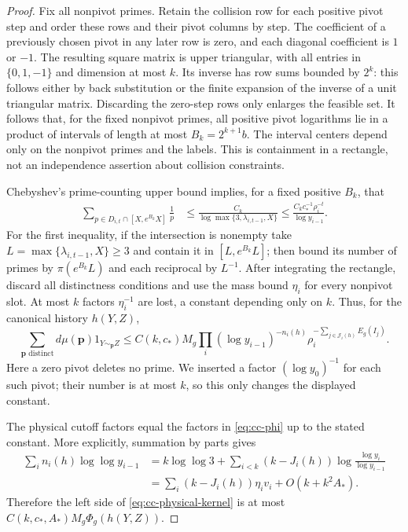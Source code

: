\begin{proof}
Fix all nonpivot primes. Retain the collision row for each positive
pivot step and order these rows and their pivot columns by step.
The coefficient of a previously chosen pivot in any later row is
zero, and each diagonal coefficient is $1$ or $-1$. The resulting
square matrix is upper triangular, with all entries in
$\{0,1,-1\}$ and dimension at most $k$. Its inverse has row sums
bounded by $2^k$: this follows either by back substitution or the
finite expansion of the inverse of a unit triangular matrix.
Discarding the zero-step rows only enlarges the feasible set.
It follows that, for the fixed nonpivot primes, all positive pivot
logarithms lie in a product of intervals of length at most
$B_k=2^{k+1}b$. The interval centers depend only on the nonpivot
primes and the labels. This is containment in a rectangle, not an
independence assertion about collision constraints.

Chebyshev's prime-counting upper bound implies, for a fixed positive
$B_k$, that
\begin{align}
 \sum_{p\in D_{i,t}\cap[X,e^{B_k}X]}\frac1p
 &\le\frac{C_k}{\log\max\{3,\lambda_{i,t-1},X\}}
 \le\frac{C_kc_*^{-1}\rho_i^{-t}}{\log y_{i-1}}.
                                                     \label{eq:cc-pivot-mass}
\end{align}
For the first inequality, if the intersection is nonempty take
$L=\max\{\lambda_{i,t-1},X\}\ge3$ and contain it in
$[L,e^{B_k}L]$; then bound its number of primes by
$\pi(e^{B_k}L)$ and each reciprocal by $L^{-1}$.
After integrating the rectangle, discard all distinctness conditions
and use the mass bound $\eta_i$ for every nonpivot slot. At most
$k$ factors $\eta_i^{-1}$ are lost, a constant depending only on
$k$. Thus, for the canonical history $h(Y,Z)$,
\begin{equation}\label{eq:cc-physical-kernel}
 \sum_{\mathbf p\text{ distinct}}d\mu(\mathbf p)
               1_{Y\sim_{\mathbf p}Z}
 \le C(k,c_*)M_g
     \prod_i(\log y_{i-1})^{-n_i(h)}
     \rho_i^{-\sum_{j\in\mathcal J_i(h)}E_g(I_j)}.
\end{equation}
Here a zero pivot deletes no prime. We inserted a factor
$(\log y_0)^{-1}$ for each such pivot; their number is at most
$k$, so this only changes the displayed constant.

The physical cutoff factors equal the factors in
\eqref{eq:cc-phi} up to the stated constant. More explicitly,
summation by parts gives
\begin{align*}
 \sum_i n_i(h)\log\log y_{i-1}
 &=k\log\log3+
   \sum_{i<k}(k-J_i(h))\log\frac{\log y_i}{\log y_{i-1}}\\
 &=\sum_i(k-J_i(h))\eta_iv_i+O(k+k^2A_*).
\end{align*}
Therefore the left side of \eqref{eq:cc-physical-kernel} is at
most $C(k,c_*,A_*)M_g\Phi_g(h(Y,Z))$.


\end{proof}
